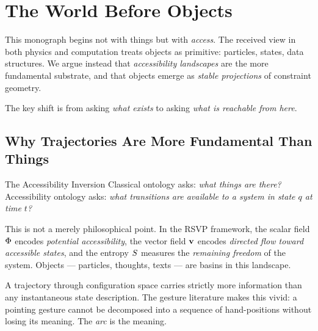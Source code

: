 
\chapter{The World Before Objects}



This monograph begins not with things but with \emph{access}. The received view
in both physics and computation treats objects as primitive: particles, states,
data structures. We argue instead that \emph{accessibility landscapes} are the
more fundamental substrate, and that objects emerge as \emph{stable projections}
of constraint geometry.

The key shift is from asking \emph{what exists} to asking \emph{what is
reachable from here}.

\section{Why Trajectories Are More Fundamental Than Things}

\begin{conceptaside}{The Accessibility Inversion}
  Classical ontology asks: \emph{what things are there?} Accessibility
  ontology asks: \emph{what transitions are available to a system in state
  $q$ at time $t$?}

  This is not a merely philosophical point. In the RSVP framework, the
  scalar field $\Phi$ encodes \emph{potential accessibility}, the
  vector field $\mathbf{v}$ encodes \emph{directed flow toward accessible
  states}, and the entropy $S$ measures the \emph{remaining freedom}
  of the system. Objects — particles, thoughts, texts — are basins in this
  landscape.
\end{conceptaside}

A trajectory through configuration space carries strictly more information than
any instantaneous state description. The gesture literature \autocite{mcneill1992}
makes this vivid: a pointing gesture cannot be decomposed into a sequence of
hand-positions without losing its meaning. The \emph{arc} is the meaning.


